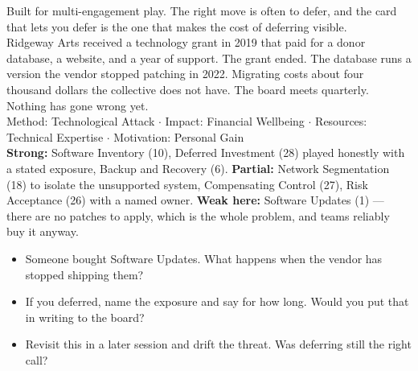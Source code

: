  Built for multi-engagement play. The right move is often to
defer, and the card that lets you defer is the one that makes the cost of
deferring visible.\\
 Ridgeway Arts received a technology grant in 2019 that paid for
a donor database, a website, and a year of support. The grant ended. The database
runs a version the vendor stopped patching in 2022. Migrating costs about four
thousand dollars the collective does not have. The board meets quarterly. Nothing
has gone wrong yet.\\
 Method: Technological Attack $\cdot$ Impact: Financial
Wellbeing $\cdot$ Resources: Technical Expertise $\cdot$ Motivation: Personal
Gain\\
 \textbf{Strong:} Software Inventory (10), Deferred Investment
(28) played honestly with a stated exposure, Backup and Recovery (6).
\textbf{Partial:} Network Segmentation (18) to isolate the unsupported system,
Compensating Control (27), Risk Acceptance (26) with a named owner.
\textbf{Weak here:} Software Updates (1) --- there are no patches to apply, which
is the whole problem, and teams reliably buy it anyway.\\
\begin{itemize}
\item Someone bought Software Updates. What happens when the vendor has stopped
shipping them?
\item If you deferred, name the exposure and say for how long. Would you put that
in writing to the board?
\item Revisit this in a later session and drift the threat. Was deferring still
the right call?
\end{itemize}

